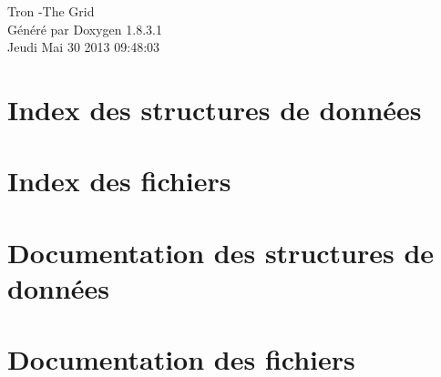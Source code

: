 \documentclass{book}
\begin{document}
\hypersetup{pageanchor=false,citecolor=blue}
\begin{titlepage}
\vspace*{7cm}
\begin{center}
{\Large Tron -\/\-The Grid }\\
\vspace*{1cm}
{\large Généré par Doxygen 1.8.3.1}\\
\vspace*{0.5cm}
{\small Jeudi Mai 30 2013 09:48:03}\\
\end{center}
\end{titlepage}
\clearemptydoublepage
{}
\tableofcontents
\clearemptydoublepage
{}
\hypersetup{pageanchor=true,citecolor=blue}
\chapter{Index des structures de données}

\chapter{Index des fichiers}

\chapter{Documentation des structures de données}












\chapter{Documentation des fichiers}




























\printindex
\end{document}

